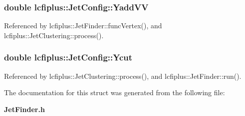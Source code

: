\subsubsection[{Yadd\-V\-V}]{\setlength{\rightskip}{0pt plus 5cm}double lcfiplus\-::\-Jet\-Config\-::\-Yadd\-V\-V}\label{structlcfiplus_1_1JetConfig_a094a72c64397a9219b792d180e64773e}


Referenced by lcfiplus\-::\-Jet\-Finder\-::func\-Vertex(), and lcfiplus\-::\-Jet\-Clustering\-::process().

\subsubsection[{Ycut}]{\setlength{\rightskip}{0pt plus 5cm}double lcfiplus\-::\-Jet\-Config\-::\-Ycut}\label{structlcfiplus_1_1JetConfig_a7f086f8330cfa571ae8246e1087022f0}


Referenced by lcfiplus\-::\-Jet\-Clustering\-::process(), and lcfiplus\-::\-Jet\-Finder\-::run().



The documentation for this struct was generated from the following file\-:\begin{DoxyCompactItemize}
\item 
{\bf Jet\-Finder.\-h}\end{DoxyCompactItemize}
